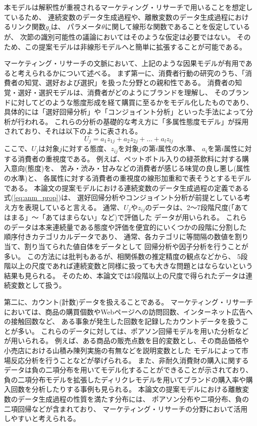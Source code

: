 本モデルは解釈性が重視されるマーケティング・リサーチで用いることを想定しているため、
連続変数のデータ生成過程や、離散変数のデータ生成過程におけるリンク関数$g_i$は、
パラメータ$\theta$に関して線形な関数であることを仮定しているが、
次節の識別可能性の議論においてはそのような仮定は必要ではない。
そのため、この提案モデルは非線形モデルへと簡単に拡張することが可能である。

マーケティング・リサーチの文脈において、上記のような因果モデルが有用であると考えられるかについて述べる。
まず第一に、消費者行動の研究のうち、「消費者の知覚、選好および選択」を扱った分野との親和性である。
消費者の知覚・選好・選択モデルは、消費者がどのようにブランドを理解し、
そのブランドに対してどのような態度形成を経て購買に至るかをモデル化したものであり、
具体的には「選好回帰分析」や「コンジョイント分析」といった手法によって分析が行われる\cite{1987-vg}。
これらの分析の基礎的な考え方に「多属性態度モデル」が採用されており、それは以下のように表される。
\begin{equation}
  U_j = a_1 z_{1j} + a_2 z_{2j} + \dots + a_l z_{lj}
\end{equation}
ここで、$U_j$は対象$j$に対する態度、$z_{ij}$を対象$j$の第$i$属性の水準、
$a_i$を第$i$属性に対する消費者の重視度である。
例えば、ペットボトル入りの緑茶飲料に対する購入意向(態度)を、
苦み・渋み・甘みなどの消費者が感じる味覚の良し悪し(属性の水準)と、
各属性に対する消費者の重視度の線形加重和で表そうとするモデルである。
本論文の提案モデルにおける連続変数のデータ生成過程の定義である式(\ref{eq:anm_prop})は、
選好回帰分析やコンジョイント分析が前提としている考え方を表現していると言える。
通常、$U_j$や$z_{ij}$のデータは、2〜7段階尺度(「あてはまる」〜「あてはまらない」など)で評価した
データが用いられる\cite{1987-vg}\cite{2018-ci}。
これらのデータは本来連続量である態度や評価を便宜的にいくつかの段階に分割した
順序付きカテゴリカルデータであり、
通常、各カテゴリに等間隔の数値を割り当て、割り当てられた値自体をデータとして
回帰分析や因子分析を行うことが多い。
この方法には批判もあるが、相関係数の推定精度の観点などから、
5段階以上の尺度であれば連続変数と同様に扱っても大きな問題とはならないという結果も見られる\cite{1996-bs}。
そのため、本論文では5段階以上の尺度で得られたデータは連続変数として扱う。

第二に、カウント(計数)データを扱えることである。
マーケティング・リサーチにおいては、商品の購買個数やWebページへの訪問回数、インターネット広告への接触回数など、
ある事象が発生した回数を記録したカウントデータを扱うことが多い。
これらのデータに対しては、ポアソン回帰モデルを用いた分析などが用いられる。
例えば、ある商品の販売点数を目的変数とし、その商品価格や小売店における山積み陳列実施の有無などを説明変数とした
モデルによって市場反応分析を行うことなどが挙げられる\cite{2015-pb}。
また、非耐久消費財の購入に関するデータは負の二項分布を用いてモデル化することができることが示されており\cite{Ehrenberg1959-ei}、
負の二項分布モデルを拡張したディリクレモデルを用いてブランドの購入率や購入回数を分析したりする事例も見られる\cite{2016-io}。
本論文の提案モデルにおける離散変数のデータ生成過程の性質を満たす分布には、
ポアソン分布や二項分布、負の二項回帰などが含まれており、
マーケティング・リサーチの分野において活用しやすいと考えられる。

